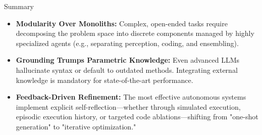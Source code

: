 \documentclass[main]{subfiles}
\begin{document}

\begin{frame}{Summary}
\begin{itemize}
    \item \textbf{Modularity Over Monoliths:} Complex, open-ended tasks require decomposing the problem space into discrete components managed by highly specialized agents (e.g., separating perception, coding, and ensembling).
    \item \textbf{Grounding Trumps Parametric Knowledge:} Even advanced LLMs hallucinate syntax or default to outdated methods. Integrating external knowledge is mandatory for state-of-the-art performance.     \item \textbf{Feedback-Driven Refinement:} The most effective autonomous systems implement explicit self-reflection—whether through simulated execution, episodic execution history, or targeted code ablations—shifting from "one-shot generation" to "iterative optimization."
\end{itemize}
\end{frame}
\end{document}
